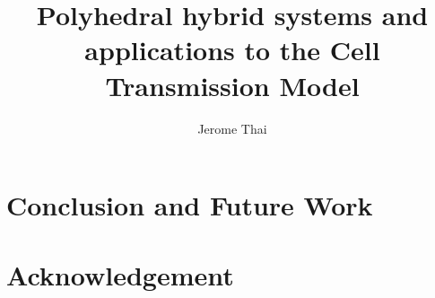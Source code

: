 \documentclass[letterpaper, 10 pt, conference]{ieeeconf}
\numberwithin{equation}{section}
\numberwithin{figure}{section}
\numberwithin{table}{section}
\begin{document}
\author{Jerome Thai}%
\title{Polyhedral hybrid systems and applications to the Cell Transmission Model}

\maketitle

\thispagestyle{empty}
\pagestyle{empty}











\section{Conclusion and Future Work}

\section{Acknowledgement}





\end{document}
